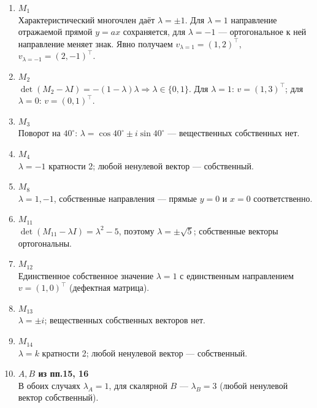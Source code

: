 \begin{enumerate}
  \item \textbf{$M_1$}\\
  Характеристический многочлен даёт $\lambda=\pm1$. Для $\lambda=1$ направление отражаемой прямой $y=ax$ сохраняется, для $\lambda=-1$ — ортогональное к ней направление меняет знак. Явно получаем
  $v_{\lambda=1}=(1,2)^\top$, $v_{\lambda=-1}=(2,-1)^\top$.

  \item \textbf{$M_2$}\\
  $\det(M_2-\lambda I)=-(1-\lambda)\lambda \Rightarrow \lambda\in\{0,1\}$. Для $\lambda=1$: $v=(1,3)^\top$; для $\lambda=0$: $v=(0,1)^\top$.

  \item \textbf{$M_3$}\\
  Поворот на $40^\circ$: $\lambda=\cos 40^\circ \pm i\sin 40^\circ$ — вещественных собственных нет.

  \item \textbf{$M_4$}\\
  $\lambda=-1$ кратности 2; любой ненулевой вектор — собственный.

  \item \textbf{$M_8$}\\
  $\lambda=1,-1$, собственные направления — прямые $y=0$ и $x=0$ соответственно.

  \item \textbf{$M_{11}$}\\
  $\det(M_{11}-\lambda I)=\lambda^2-5$, поэтому $\lambda=\pm\sqrt{5}$; собственные векторы ортогональны.

  \item \textbf{$M_{12}$}\\
  Единственное собственное значение $\lambda=1$ с единственным направлением $v=(1,0)^\top$ (дефектная матрица).

  \item \textbf{$M_{13}$}\\
  $\lambda=\pm i$; вещественных собственных векторов нет.

  \item \textbf{$M_{14}$}\\
  $\lambda=k$ кратности 2; любой ненулевой вектор — собственный.

  \item \textbf{$A,B$ из пп.15, 16}\\
  В обоих случаях $\lambda_A=1$, для скалярной $B$ — $\lambda_B=3$ (любой ненулевой вектор собственный).
\end{enumerate}

